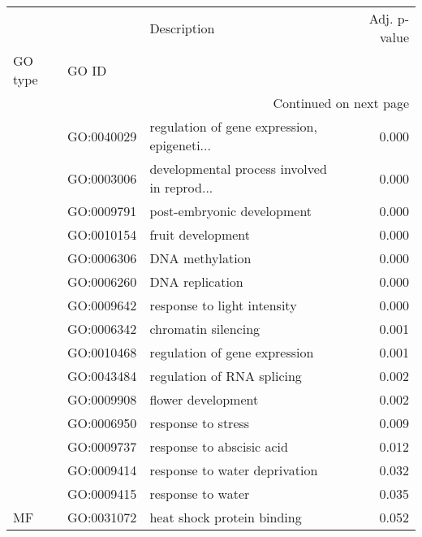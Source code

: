\begin{longtable}{lllr}
\toprule
   &            &                                  Description &  Adj. p-value \\
GO type & GO ID &                                              &               \\
\midrule
\endhead
\midrule
\multicolumn{4}{r}{{Continued on next page}} \\
\midrule
\endfoot

\bottomrule
\endlastfoot
\multirow{15}{*}{BP} & GO:0040029 &  regulation of gene expression, epigeneti... &         0.000 \\
   & GO:0003006 &  developmental process involved in reprod... &         0.000 \\
   & GO:0009791 &                   post-embryonic development &         0.000 \\
   & GO:0010154 &                            fruit development &         0.000 \\
   & GO:0006306 &                              DNA methylation &         0.000 \\
   & GO:0006260 &                              DNA replication &         0.000 \\
   & GO:0009642 &                  response to light intensity &         0.000 \\
   & GO:0006342 &                          chromatin silencing &         0.001 \\
   & GO:0010468 &                regulation of gene expression &         0.001 \\
   & GO:0043484 &                   regulation of RNA splicing &         0.002 \\
   & GO:0009908 &                           flower development &         0.002 \\
   & GO:0006950 &                           response to stress &         0.009 \\
   & GO:0009737 &                    response to abscisic acid &         0.012 \\
   & GO:0009414 &                response to water deprivation &         0.032 \\
   & GO:0009415 &                            response to water &         0.035 \\
\cline{1-4}
MF & GO:0031072 &                   heat shock protein binding &         0.052 \\
\end{longtable}
